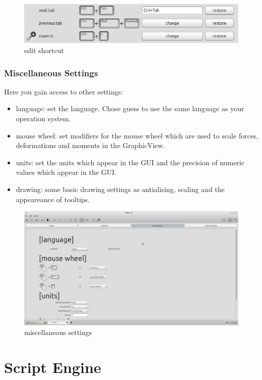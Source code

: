 \documentclass[a4paper,11pt]{report}
\begin{document}
\begin{figure}[H]
\includegraphics[width=\textwidth]{../pictures/editshortcut.png}
\caption{edit shortcut}
\label{pic:editshortcut}
\end{figure}

\subsection{Miscellaneous Settings}
\label{ssec:miscsettings}
Here you gain access to other settings:
\begin{itemize}
	\item language: set the language. Chose guess to use the same language as your operation system.
	\item mouse wheel: set modifiers for the mouse wheel which are used to scale forces, deformations and moments in the GraphicView.
	\item units: set the units which appear in the GUI and the precision of numeric values which appear in the GUI.
	\item drawing: some basic drawing settings as antialising, scaling and the appeareance of tooltips.
\end{itemize}
\begin{figure}[H]
\includegraphics[width=\textwidth]{../pictures/settings_misc.png}
\caption{miscellaneous settings}
\label{pic:miscsettings}
\end{figure}

\chapter{Script Engine}
\label{cha:scripting}

\end{document}
